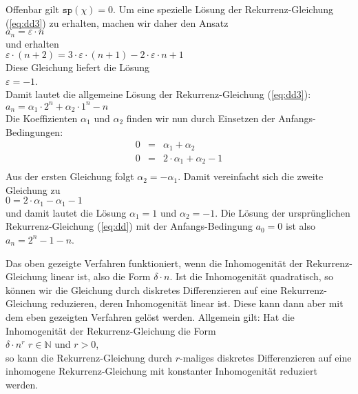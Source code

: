 \begin{enumerate}
      Offenbar gilt $\mathtt{sp}(\chi) = 0$.  Um eine spezielle L\"{o}sung der
      Rekurrenz-Gleichung
      (\ref{eq:dd3}) zu erhalten, machen wir daher den Ansatz \\[0.2cm]
      \hspace*{1.3cm} $a_n = \varepsilon \cdot n$ \\[0.2cm]
      und erhalten \\[0.2cm]
      \hspace*{1.3cm} 
      $\varepsilon \cdot (n+2) = 3 \cdot \varepsilon \cdot (n+1) - 2 \cdot \varepsilon \cdot n + 1$ 
      \\[0.2cm]
      Diese Gleichung liefert die L\"{o}sung \\[0.2cm]
      \hspace*{1.3cm} 
      $\varepsilon = -1$. \\[0.2cm]
      Damit lautet die allgemeine L\"{o}sung der Rekurrenz-Gleichung (\ref{eq:dd3}): \\[0.2cm]
      \hspace*{1.3cm} $a_n = \alpha_1 \cdot 2^n + \alpha_2 \cdot 1^n - n$ \\[0.2cm]
      Die Koeffizienten $\alpha_1$ und $\alpha_2$ finden wir nun durch Einsetzen der
      Anfangs-Bedingungen:
      \[
      \begin{array}{lcl}
        0 & = & \alpha_1 + \alpha_2 \\
        0 & = & 2 \cdot \alpha_1 + \alpha_2 - 1 \\
      \end{array}
      \]
      Aus der ersten Gleichung folgt $\alpha_2 = - \alpha_1$.  Damit vereinfacht sich die
      zweite Gleichung zu \\[0.2cm]
      \hspace*{1.3cm} $0 = 2 \cdot \alpha_1 - \alpha_1 - 1$ \\[0.2cm]
      und damit lautet die L\"{o}sung $\alpha_1 = 1$ und $\alpha_2 = -1$.  Die L\"{o}sung der
      urspr\"{u}nglichen Rekurrenz-Gleichung (\ref{eq:dd}) mit der Anfangs-Bedingung $a_0 = 0$ 
      ist also \\[0.2cm]
      \hspace*{1.3cm} $a_n = 2^n - 1 - n$.
\end{enumerate}
Das oben gezeigte Verfahren funktioniert, wenn die Inhomogenit\"{a}t der Rekurrenz-Gleichung
linear ist, also die Form $\delta \cdot n$.  Ist die Inhomogenit\"{a}t quadratisch, so k\"{o}nnen wir
die Gleichung durch diskretes Differenzieren auf eine Rekurrenz-Gleichung reduzieren,
deren Inhomogenit\"{a}t linear ist.  Diese kann dann aber mit dem eben gezeigten Verfahren
gel\"{o}st werden.  Allgemein gilt:  Hat die Inhomogenit\"{a}t der Rekurrenz-Gleichung die Form \\[0.2cm]
\hspace*{1.3cm} $\delta \cdot n^r$ \quad $r \in \mathbb{N}$ und $r > 0$, \\[0.2cm]
so kann die Rekurrenz-Gleichung durch $r$-maliges diskretes Differenzieren auf eine
inhomogene Rekurrenz-Gleichung mit konstanter Inhomogenit\"{a}t reduziert werden.
\vspace*{0.3cm}
\pagebreak

